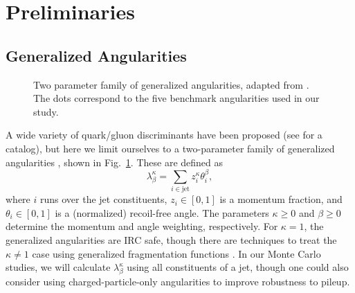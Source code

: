 \documentclass[11pt,letterpaper]{article}
\newcommand{\genang}[2]{{\lambda^{#1}_{#2}}}
\DeclareRobustCommand{\Fig}[1]{Fig.~\ref{#1}}
\begin{document}
\section{Preliminaries}
\label{sec:prelim}

\subsection{Generalized Angularities}

\begin{figure}
\centering
{}
\caption{Two parameter family of generalized angularities, adapted from \cite{Larkoski:2014pca}.  The dots correspond to the five benchmark angularities used in our study.}
\label{fig:lambda_space}
\end{figure}

A wide variety of quark/gluon discriminants have been proposed (see \cite{} for a catalog), but here we limit ourselves to a two-parameter family of generalized angularities \cite{}, shown in \Fig{fig:lambda_space}.  These are defined as
\begin{equation}
\label{eq:genang}
\genang{\kappa}{\beta} = \sum_{i \in \text{jet}} z_i^\kappa \theta_i^\beta,
\end{equation}
where $i$ runs over the jet constituents, $z_i \in [0,1]$ is a momentum fraction, and $\theta_i \in [0,1]$ is a (normalized) recoil-free angle. The parameters $\kappa \ge 0$ and $\beta \ge 0$ determine the momentum and angle weighting, respectively.  For $\kappa = 1$, the generalized angularities are IRC safe, though there are techniques to treat the $\kappa \not= 1$ case using generalized fragmentation functions \cite{Larkoski:2014pca}.  In our Monte Carlo studies, we will calculate $\genang{\kappa}{\beta}$ using all constituents of a jet, though one could also consider using charged-particle-only angularities to improve robustness to pileup.
\end{document}
